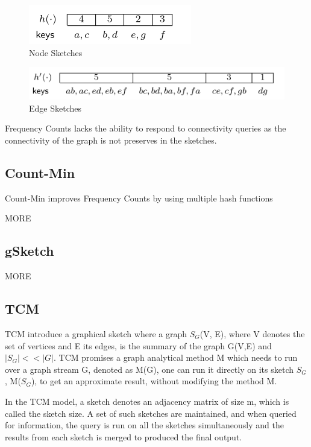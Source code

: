 \documentclass[12pt]{report}
\numberwithin{figure}{section}
\numberwithin{table}{section}
\begin{document}
\begin{figure}[H]
\centering
\includegraphics[scale=0.6]{images/NodeSketches}
\caption{Node Sketches}
\label{fig:NodeSketches}
\end{figure}

\begin{figure}[H]
\centering
\includegraphics[scale=0.6]{images/EdgeSketches}
\caption{Edge Sketches}
\label{fig:EdgeSketches}
\end{figure}

Frequency Counts lacks the ability to respond to connectivity queries as the connectivity of the graph is not preserves in the sketches\cite{TCM}.

\subsection{Count-Min}
Count-Min\cite{CountMin} improves Frequency Counts  by using multiple hash functions

 MORE
\subsection{gSketch}
\cite{gSketch} MORE

\subsection{TCM}

TCM introduce a graphical sketch where a graph $S_G$(V, E), where V denotes the set of vertices and E its edges, is the summary of the graph G(V,E) and $|S_G| << |G|$. TCM promises a graph analytical method M which needs to run over a graph stream G, denoted as M(G), one can run it directly on its sketch $S_G$, M($S_G$), to get an approximate result, without modifying the method M.

In the TCM model, a sketch denotes an adjacency matrix of size m, which is called the sketch size. A set of such sketches are maintained, and when queried for information, the query is run on all the sketches simultaneously and the results from each sketch is merged to produced the final output. 
\end{document}
